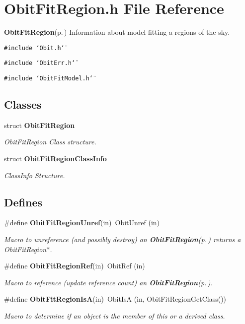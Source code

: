 \section{Obit\-Fit\-Region.h File Reference}
\label{ObitFitRegion_8h}
{\bf Obit\-Fit\-Region}{\rm (p.\,\pageref{structObitFitRegion})} Information about model fitting a regions of the sky. 

{\tt \#include \char`\"{}Obit.h\char`\"{}}\par
{\tt \#include \char`\"{}Obit\-Err.h\char`\"{}}\par
{\tt \#include \char`\"{}Obit\-Fit\-Model.h\char`\"{}}\par
\subsection*{Classes}
\begin{CompactItemize}
\item 
struct {\bf Obit\-Fit\-Region}
\begin{CompactList}\small\item\em Obit\-Fit\-Region Class structure. \item\end{CompactList}\item 
struct {\bf Obit\-Fit\-Region\-Class\-Info}
\begin{CompactList}\small\item\em Class\-Info Structure. \item\end{CompactList}\end{CompactItemize}
\subsection*{Defines}
\begin{CompactItemize}
\item 
\#define {\bf Obit\-Fit\-Region\-Unref}(in)\ Obit\-Unref (in)
\begin{CompactList}\small\item\em Macro to unreference (and possibly destroy) an {\bf Obit\-Fit\-Region}{\rm (p.\,\pageref{structObitFitRegion})} returns a Obit\-Fit\-Region$\ast$. \item\end{CompactList}\item 
\#define {\bf Obit\-Fit\-Region\-Ref}(in)\ Obit\-Ref (in)
\begin{CompactList}\small\item\em Macro to reference (update reference count) an {\bf Obit\-Fit\-Region}{\rm (p.\,\pageref{structObitFitRegion})}. \item\end{CompactList}\item 
\#define {\bf Obit\-Fit\-Region\-Is\-A}(in)\ Obit\-Is\-A (in, Obit\-Fit\-Region\-Get\-Class())
\begin{CompactList}\small\item\em Macro to determine if an object is the member of this or a derived class. \item\end{CompactList}\end{CompactItemize}
